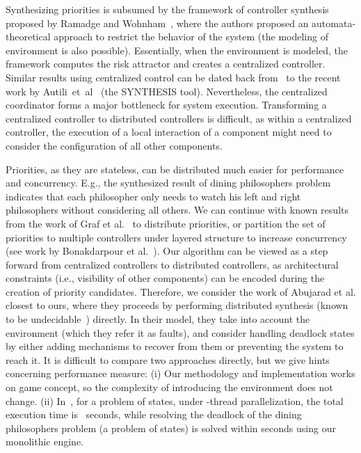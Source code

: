 \documentclass[10pt, a4paper, onecolumn, conference, compsocconf]{IEEEtran}
\begin{document}
Synthesizing priorities is subsumed by the framework of controller synthesis proposed by Ramadge and Wohnham~\cite{ramadge1989control}, where the authors proposed an automata-theoretical approach to restrict the behavior of the system (the modeling of environment is also possible).
Essentially, when the environment is modeled, the framework computes the risk attractor and creates a centralized controller.
Similar results using centralized control can be dated back from~\cite{balemi1993supervisory} to the recent work by Autili~et~al~\cite{autili2007synthesis} (the SYNTHESIS tool). Nevertheless, the centralized coordinator forms a major bottleneck for system execution. Transforming a centralized controller to distributed controllers is difficult, as within a centralized controller, the execution of a local interaction of a component might need to consider the configuration of all other components.

Priorities, as they are stateless, can be distributed much easier for performance and concurrency. E.g., the synthesized result of dining philosophers problem indicates that each philosopher only needs to watch his left and right philosophers without considering all others. We can continue with known results from the work of Graf et al.~\cite{GrafPQ10} to distribute priorities, or partition the set of priorities to multiple controllers under layered structure to increase concurrency (see work by Bonakdarpour et al.~\cite{Bonakdarpour2011distribute}). Our algorithm can be viewed as a step forward from centralized controllers to distributed controllers, as architectural constraints (i.e., visibility of other components) can be encoded during the creation of priority candidates. Therefore, we consider the work of Abujarad et al.\cite{abujarad2009parallelizing}  closest to ours, where they proceeds by performing distributed synthesis (known to be undecidable~\cite{PnueliFOCS90})  directly. In their model, they take into account the environment (which they refer it as faults), and consider handling deadlock states by either adding mechanisms to recover from them or preventing the system to reach it. It is difficult to compare two approaches directly, but we give hints concerning performance measure: (i) Our methodology and implementation works on game concept, so the complexity of introducing the environment does not change. (ii) In~\cite{abujarad2009parallelizing}, for a problem of  states, under -thread parallelization, the total execution time is ~seconds, while resolving the deadlock of the  dining philosophers problem (a problem of  states) is solved within  seconds using our monolithic engine.
\end{document}
